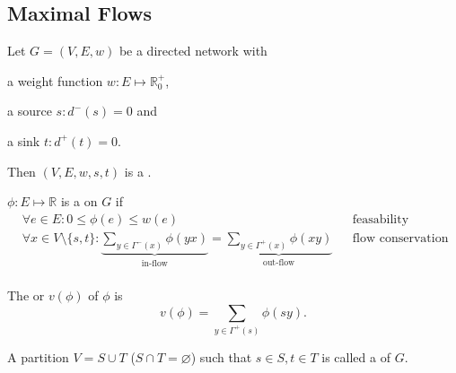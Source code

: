 

\subsection*{Maximal Flows}

\def\dminus{\ensuremath{d^{-}}}
\def\dplus{\ensuremath{d^{+}}}
\def\real{\mathbb{R}}
\def\natural{\mathbb{N}}
\def\Gammaplus{\ensuremath{\Gamma^{+}}}
\def\Gammaminus{\ensuremath{\Gamma^{-}}}

\begin{definition}
Let $G=(V,E,w)$ be a directed network with
\begin{compactitem}
\item a weight function $w: E\mapsto \real_0^{+}$,
\item a source $s: \dminus(s) = 0$ and
\item a sink $t: \dplus(t) = 0$.
\end{compactitem}
Then $(V, E, w, s, t)$ is a .
\end{definition}

\begin{definition}
$\phi: E\mapsto \real$ is a  on $G$ if
\begin{align*}
  &\forall e\in E: 0 ≤ \phi(e) ≤ w(e)
     &&\text{feasability condition} \\
  &\forall x\in V\setminus\{s,t\}:
     \underbrace{\sum_{y\in \Gammaminus(x)} \phi(yx)}_{\text{in-flow}} =
     \underbrace{\sum_{y\in \Gammaplus(x)} \phi(xy)}_{\text{out-flow}}
     &&\text{flow conservation condition} \\
\end{align*}
\end{definition}

\begin{definition}
The  or  $v(\phi)$ of $\phi$ is
\[
  v(\phi) = \sum_{y\in \Gammaplus(s)} \phi(sy).
\]
\end{definition}



\begin{definition}
A partition $V=S \cup T$ ($S\cap T=\varnothing$) such that $s \in S, t \in T$
is called a  of $G$.
\end{definition}

